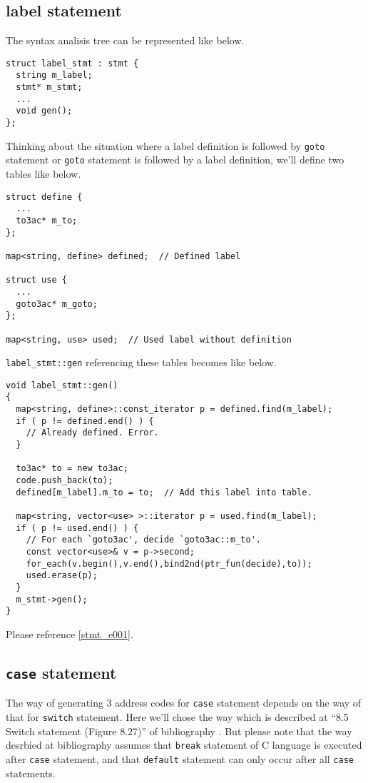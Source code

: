 \subsection{label statement}
\label{stmt_e000}
The syntax analisis tree can be represented like below.
\begin{verbatim}
struct label_stmt : stmt {
  string m_label;
  stmt* m_stmt;
  ...
  void gen();
};
\end{verbatim}
Thinking about the situation where
a label definition is followed by {\tt{goto}} statement or
{\tt{goto}} statement is followed by a label definition,
we'll define two tables like below.
\begin{verbatim}
struct define {
  ...
  to3ac* m_to;
};

map<string, define> defined;  // Defined label

struct use {
  ...
  goto3ac* m_goto;
};

map<string, use> used;  // Used label without definition
\end{verbatim}
{\tt{label\_stmt::gen}} referencing these tables
becomes like below.
\begin{verbatim}
void label_stmt::gen()
{
  map<string, define>::const_iterator p = defined.find(m_label);
  if ( p != defined.end() ) {
    // Already defined. Error.
  }

  to3ac* to = new to3ac;
  code.push_back(to);
  defined[m_label].m_to = to;  // Add this label into table.

  map<string, vector<use> >::iterator p = used.find(m_label);
  if ( p != used.end() ) {
    // For each `goto3ac', decide `goto3ac::m_to'.
    const vector<use>& v = p->second;
    for_each(v.begin(),v.end(),bind2nd(ptr_fun(decide),to));
    used.erase(p);
  }
  m_stmt->gen();
}
\end{verbatim}
Please reference \ref{stmt_e001}.

\subsection{{\tt{case}} statement}
\label{stmt_e002}
The way of generating 3 address codes for {\tt{case}} statement
depends on the way of that for {\tt{switch}} statement.
Here we'll chose the way which is described at ``8.5 Switch statement
(Figure 8.27)'' of bibliography \cite{doragon}.
But please note that the way desrbied at bibliography \cite{doragon}
assumes that
{\tt{break}} statement of C language is executed after {\tt{case}} statement,
and that {\tt{default}} statement can only occur
after all {\tt{case}} statements.

